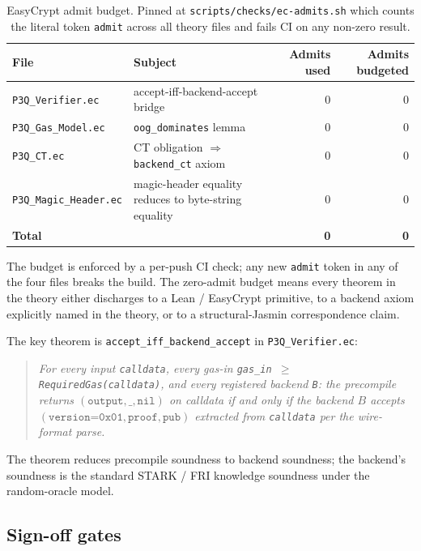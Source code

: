 \begin{table}[h]
\centering
\small
\begin{tabular}{@{}llrr@{}}
\toprule
\textbf{File} & \textbf{Subject} & \textbf{Admits used} & \textbf{Admits budgeted} \\
\midrule
\texttt{P3Q\_Verifier.ec}     & accept-iff-backend-accept bridge & 0 & 0 \\
\texttt{P3Q\_Gas\_Model.ec}   & \texttt{oog\_dominates} lemma     & 0 & 0 \\
\texttt{P3Q\_CT.ec}           & CT obligation $\Rightarrow$ \texttt{backend\_ct} axiom & 0 & 0 \\
\texttt{P3Q\_Magic\_Header.ec} & magic-header equality reduces to byte-string equality & 0 & 0 \\
\midrule
\textbf{Total} & & \textbf{0} & \textbf{0} \\
\bottomrule
\end{tabular}
\caption{EasyCrypt admit budget. Pinned at
\texttt{scripts/checks/ec-admits.sh} which counts the literal token
\texttt{admit} across all theory files and fails CI on any
non-zero result.}
\label{tab:ec-admits}
\end{table}

The budget is enforced by a per-push CI check; any new \texttt{admit}
token in any of the four files breaks the build. The
zero-admit budget means every theorem in the theory either
discharges to a Lean / EasyCrypt primitive, to a backend axiom
explicitly named in the theory, or to a structural-Jasmin
correspondence claim.

The key theorem is \texttt{accept\_iff\_backend\_accept} in
\texttt{P3Q\_Verifier.ec}:

\begin{quote}
\emph{For every input \texttt{calldata}, every gas-in
\texttt{gas\_in $\ge$ RequiredGas(calldata)}, and every registered
backend \texttt{B}: the precompile returns
$(\texttt{output}, \_, \texttt{nil})$ on calldata if and only if the
backend $B$ accepts $(\texttt{version=0x01}, \texttt{proof}, \texttt{pub})$
extracted from \texttt{calldata} per the wire-format parse.}
\end{quote}

The theorem reduces precompile soundness to backend soundness; the
backend's soundness is the standard STARK / FRI knowledge soundness
under the random-oracle model.

\subsection{Sign-off gates}

